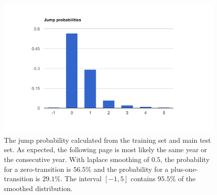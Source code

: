 
\begin{figure}
        \centering        \includegraphics[scale=0.7]{resources/jump_distribution.png}
        \caption{The jump probability calculated from the training set and main test set.
        As expected, the following page is most likely the same year or the consecutive year. With laplace smoothing of $0.5$, the probability for a zero-transition is $56.5\%$ and the probability for a plus-one-transition is $29.1\%$. The interval $[-1,5]$ contains $95.5\%$ of the smoothed distribution.}
        \label{fig:jump_prob}
\end{figure}
